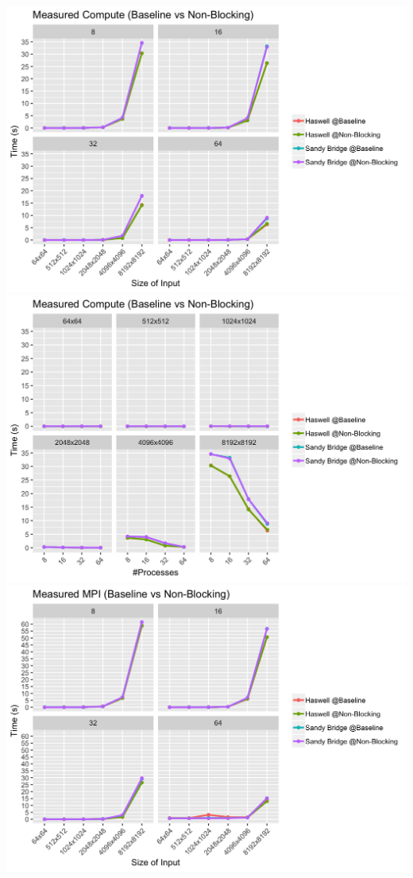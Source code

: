 \documentclass[10pt, letterpaper, twoside]{article}
\begin{document}
\begin{titlepage}
\begin{enumerate}
\vspace{5mm}
\includegraphics[scale = 0.18]{P2PBaseline_Measured-Compute_Processes.png}
\includegraphics[scale = 0.18]{P2PBaseline_Measured-Compute_InputSize.png}
\vspace{5mm}
\includegraphics[scale = 0.18]{P2PBaseline_Measured-MPI_Processes.png}

\end{enumerate}
\end{titlepage}
\end{document}
